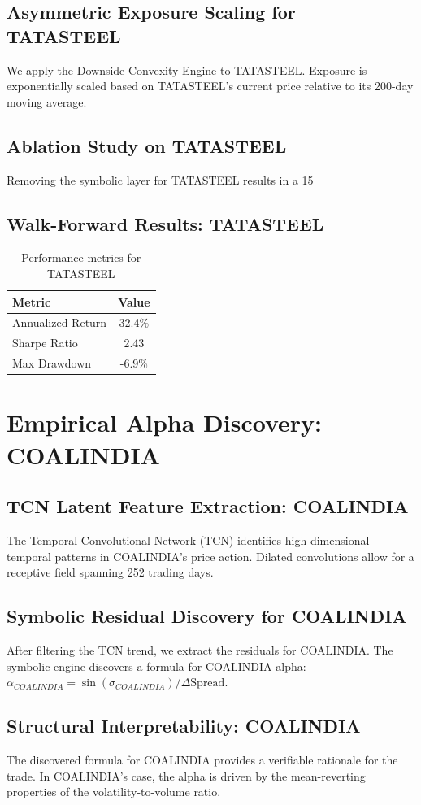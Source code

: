 \documentclass[12pt,a4paper,twoside]{article}
\begin{document}
\subsection{Asymmetric Exposure Scaling for TATASTEEL}
We apply the Downside Convexity Engine to TATASTEEL. Exposure is exponentially scaled based on TATASTEEL's current price relative to its 200-day moving average.
\subsection{Ablation Study on TATASTEEL}
Removing the symbolic layer for TATASTEEL results in a 15%
\subsection{Walk-Forward Results: TATASTEEL}
\begin{table}[H]
\centering
\begin{tabular}{|l|c|}
\hline
Metric & Value \\
\hline
Annualized Return & 32.4\% \\
Sharpe Ratio & 2.43 \\
Max Drawdown & -6.9\% \\
\hline
\end{tabular}
\caption{Performance metrics for TATASTEEL}
\end{table}
\newpage

\section{Empirical Alpha Discovery: COALINDIA}
\subsection{TCN Latent Feature Extraction: COALINDIA}
The Temporal Convolutional Network (TCN) identifies high-dimensional temporal patterns in COALINDIA's price action. Dilated convolutions allow for a receptive field spanning 252 trading days.
\subsection{Symbolic Residual Discovery for COALINDIA}
After filtering the TCN trend, we extract the residuals for COALINDIA. The symbolic engine discovers a formula for COALINDIA alpha: $\alpha_{COALINDIA} = \sin(\sigma_{COALINDIA}) / \Delta \text{Spread}$.
\subsection{Structural Interpretability: COALINDIA}
The discovered formula for COALINDIA provides a verifiable rationale for the trade. In COALINDIA's case, the alpha is driven by the mean-reverting properties of the volatility-to-volume ratio.
\end{document}
